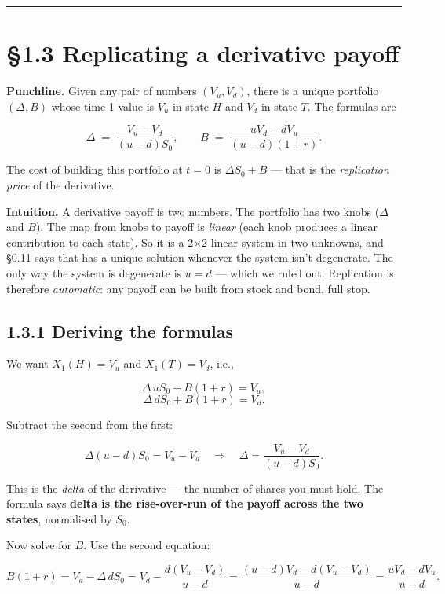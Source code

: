 \documentclass[
  10pt,
  twoside]{book}
\begin{document}
\begin{center}\rule{0.5\linewidth}{0.5pt}\end{center}

\section{§1.3 Replicating a derivative
payoff}\label{replicating-a-derivative-payoff}

\textbf{Punchline.} Given any pair of numbers \((V_u, V_d)\), there is a
unique portfolio \((\Delta, B)\) whose time-1 value is \(V_u\) in state
\(H\) and \(V_d\) in state \(T\). The formulas are

\[\boxed{\Delta \;=\; \frac{V_u - V_d}{(u-d)S_0}, \qquad B \;=\; \frac{uV_d - dV_u}{(u-d)(1+r)}.}\]

The cost of building this portfolio at \(t=0\) is \(\Delta S_0 + B\) ---
that is the \emph{replication price} of the derivative.

\textbf{Intuition.} A derivative payoff is two numbers. The portfolio
has two knobs (\(\Delta\) and \(B\)). The map from knobs to payoff is
\emph{linear} (each knob produces a linear contribution to each state).
So it is a 2×2 linear system in two unknowns, and §0.11 says that has a
unique solution whenever the system isn't degenerate. The only way the
system is degenerate is \(u=d\) --- which we ruled out. Replication is
therefore \emph{automatic}: any payoff can be built from stock and bond,
full stop.

\subsection{1.3.1 Deriving the formulas}\label{deriving-the-formulas}

We want \(X_1(H) = V_u\) and \(X_1(T) = V_d\), i.e.,

\[\Delta\, uS_0 + B(1+r) = V_u,\] \[\Delta\, dS_0 + B(1+r) = V_d.\]

Subtract the second from the first:

\[\Delta(u - d)S_0 = V_u - V_d \quad\Longrightarrow\quad \Delta = \frac{V_u - V_d}{(u-d)S_0}.\]

This is the \emph{delta} of the derivative --- the number of shares you
must hold. The formula says \textbf{delta is the rise-over-run of the
payoff across the two states}, normalised by \(S_0\).

Now solve for \(B\). Use the second equation:

\[B(1+r) = V_d - \Delta\, dS_0 = V_d - \frac{d(V_u-V_d)}{u-d} = \frac{(u-d)V_d - d(V_u-V_d)}{u-d} = \frac{uV_d - dV_u}{u-d}.\]
\end{document}
